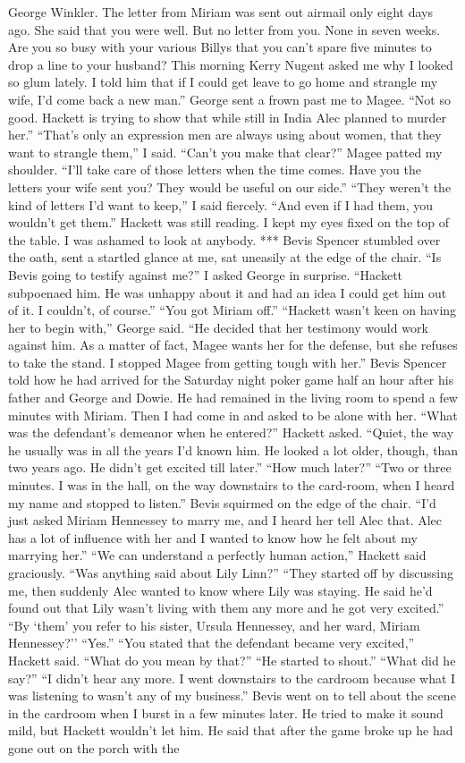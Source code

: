 \documentclass{novel}
\begin{document}
George Winkler. The letter from Miriam was sent out airmail only eight days ago. She said that you were well. But no letter from you. None in seven weeks. Are you so busy with your various Billys that you can’t spare five minutes to drop a line to your husband? This morning Kerry Nugent asked me why I looked so glum lately. I told him that if I could get leave to go home and strangle my wife, I’d come back a new man.” George sent a frown past me to Magee. “Not so good. Hackett is trying to show that while still in India Alec planned to murder her.” “That’s only an expression men are always using about women, that they want to strangle them,” I said. “Can’t you make that clear?” Magee patted my shoulder. “I’ll take care of those letters when the time comes. Have you the letters your wife sent you? They would be useful on our side.” “They weren’t the kind of letters I’d want to keep,” I said fiercely. “And even if I had them, you wouldn’t get them.” Hackett was still reading. I kept my eyes fixed on the top of the table. I was ashamed to look at anybody. *** Bevis Spencer stumbled over the oath, sent a startled glance at me, sat uneasily at the edge of the chair. “Is Bevis going to testify against me?” I asked George in surprise. “Hackett subpoenaed him. He was unhappy about it and had an idea I could get him out of it. I couldn’t, of course.” “You got Miriam off.” “Hackett wasn’t keen on having her to begin with,” George said. “He decided that her testimony would work against him. As a matter of fact, Magee wants her for the defense, but she refuses to take the stand. I stopped Magee from getting tough with her.” Bevis Spencer told how he had arrived for the Saturday night poker game half an hour after his father and George and Dowie. He had remained in the living room to spend a few minutes with Miriam. Then I had come in and asked to be alone with her. “What was the defendant’s demeanor when he entered?” Hackett asked. “Quiet, the way he usually was in all the years I’d known him. He looked a lot older, though, than two years ago. He didn’t get excited till later.” “How much later?” “Two or three minutes. I was in the hall, on the way downstairs to the card-room, when I heard my name and stopped to listen.” Bevis squirmed on the edge of the chair. “I’d just asked Miriam Hennessey to marry me, and I heard her tell Alec that. Alec has a lot of influence with her and I wanted to know how he felt about my marrying her.” “We can understand a perfectly human action,” Hackett said graciously. “Was anything said about Lily Linn?” “They started off by discussing me, then suddenly Alec wanted to know where Lily was staying. He said he’d found out that Lily wasn’t living with them any more and he got very excited.” “By ‘them’ you refer to his sister, Ursula Hennessey, and her ward, Miriam Hennessey?’’ “Yes.” “You stated that the defendant became very excited,” Hackett said. “What do you mean by that?” “He started to shout.” “What did he say?” “I didn’t hear any more. I went downstairs to the cardroom because what I was listening to wasn’t any of my business.” Bevis went on to tell about the scene in the cardroom when I burst in a few minutes later. He tried to make it sound mild, but Hackett wouldn’t let him. He said that after the game broke up he had gone out on the porch with the 
\end{document}
